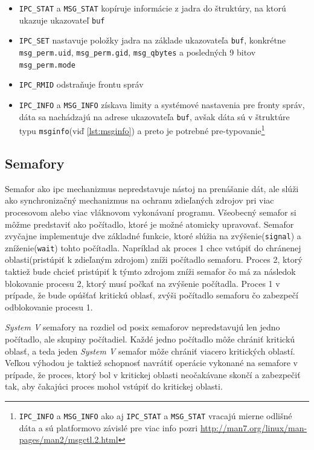 \begin{itemize}
\item \texttt{IPC\_STAT} a \texttt{MSG\_STAT} kopíruje informácie z jadra do štruktúry, na ktorú ukazuje ukazovateľ \texttt{buf}
\item \texttt{IPC\_SET} nastavuje položky jadra na základe ukazovateľa \texttt{buf}, konkrétne \texttt{msg\_perm.uid}, \texttt{msg\_perm.gid}, \texttt{msg\_qbytes} a posledných 9 bitov \texttt{msg\_perm.mode}
\item \texttt{IPC\_RMID} odstraňuje frontu správ
\item \texttt{IPC\_INFO} a \texttt{MSG\_INFO} získava limity a systémové nastavenia pre fronty správ, dáta sa nachádzajú na adrese ukazovateľa \texttt{buf}, avšak dáta sú v štruktúre typu \texttt{msginfo}(viď \ref{lst:msginfo}) a preto je potrebné pre-typovanie\footnote{\texttt{IPC\_INFO} a \texttt{MSG\_INFO} ako aj \texttt{IPC\_STAT} a \texttt{MSG\_STAT} vracajú mierne odlišné dáta a sú platformovo závislé pre viac info pozri \url{http://man7.org/linux/man-pages/man2/msgctl.2.html}}
\end{itemize}
\subsection{Semafory}
Semafor ako \acrshort{ipc} mechanizmus nepredstavuje nástoj na prenášanie dát, ale slúži ako synchronizačný mechanizmus na ochranu zdieľaných zdrojov pri viac procesovom alebo viac vláknovom vykonávaní programu. Všeobecný semafor si môžme predstaviť ako počítadlo, ktoré je možné atomicky upravovať. Semafor zvyčajne implementuje dve základné funkcie, ktoré slúžia na zvýšenie(\texttt{signal}) a zníženie(\texttt{wait}) tohto počítadla. Napríklad ak proces 1 chce vstúpiť do chránenej oblasti(pristúpiť k zdieľaným zdrojom) zníži počítadlo semaforu. Proces 2, ktorý taktiež bude chcieť pristúpiť k týmto zdrojom zníži semafor čo má za následok blokovanie procesu 2, ktorý musí počkať na zvýšenie počítadla. Proces 1 v prípade, že bude opúšťať kritickú oblasť, zvýši počítadlo semaforu čo zabezpečí odblokovanie procesu 1.

\textit{System V} semafory na rozdiel od \acrshort{posix} semaforov nepredstavujú len jedno počítadlo, ale skupiny počítadiel. Každé jedno počítadlo môže chrániť kritickú oblasť, a teda jeden \textit{System V} semafor môže chrániť viacero kritických oblastí. Veľkou výhodou je taktiež schopnosť navrátiť operácie vykonané na semafore v prípade, že proces, ktorý bol v kritickej oblasti neočakávane skončí a zabezpečiť tak, aby čakajúci proces mohol vstúpiť do kritickej oblasti. 


